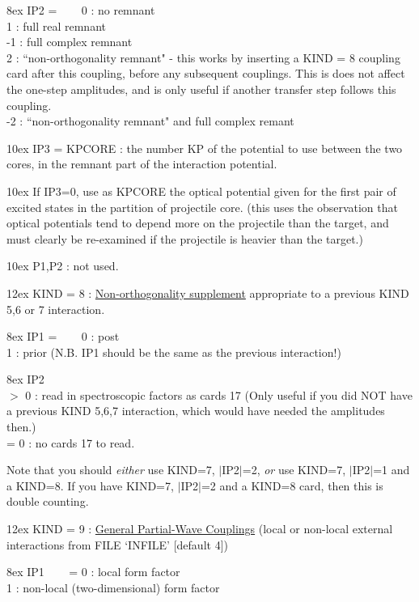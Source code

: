\documentclass[11pt]{article}
\begin{document}
\hangindent 8ex  IP2 =
~~~  0 : no remnant
\\  1 : full real remnant
\\  -1 : full complex remnant
\\  2 : ``non-orthogonality remnant" - this works by inserting
a KIND = 8 coupling card after this coupling, before any subsequent
couplings.
This is does not affect the one-step amplitudes, and is only useful
if another transfer step follows this coupling.
\\  -2 : ``non-orthogonality remnant" and full complex remant



\hangindent 10ex
 IP3 = KPCORE : the number KP of the potential to use between
the two cores, in the remnant part of the interaction potential.

\hangindent 10ex
       If IP3=0, use as KPCORE the optical potential given for
the first pair of excited states in the partition of projectile core.
(this uses the observation that optical potentials tend to depend
more on the projectile than the target, and must clearly be re-examined
if the projectile is heavier than the target.)

\hangindent 10ex
 P1,P2 : not used.
\bigskip


\hangindent 12ex
KIND = 8 :
\underline{Non-orthogonality supplement}
appropriate to a previous
KIND 5,6 or 7 interaction.


\hangindent 8ex  IP1 =
~~~  0 : post
\\  1 : prior
 (N.B. IP1 should be the same as the previous interaction!)



\hangindent 8ex  IP2
\\  $>$ 0 : read in spectroscopic factors as cards 17
 (Only useful if you did NOT have a previous KIND 5,6,7
interaction, which would have needed the amplitudes then.)
\\  = 0 : no cards 17 to read.


Note that you should {\em either} use KIND=7, $|$IP2$|$=2,
{\em or} use  KIND=7, $|$IP2$|$=1  and a KIND=8.
If you have KIND=7, $|$IP2$|$=2 and a KIND=8 card, then this is
double counting.
\bigskip


\hangindent 12ex
KIND = 9 :
\underline{General Partial-Wave Couplings}
(local or non-local external interactions from FILE `INFILE' [default 4])

\hangindent 8ex  IP1
~~~  = 0 : local form factor
\\   1 : non-local (two-dimensional) form factor
\end{document}
